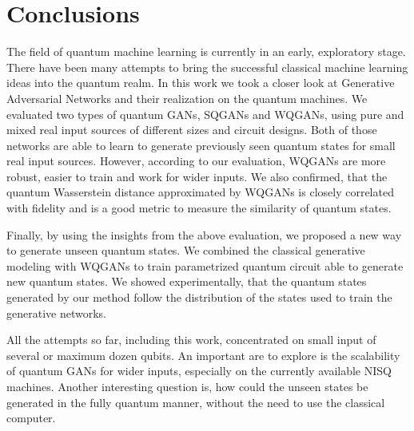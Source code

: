 \chapter{Conclusions}\label{chapter:conclusions}
The field of quantum machine learning is currently in an early, exploratory
stage. There have been many attempts to bring the successful classical machine
learning ideas into the quantum realm. In this work we took a closer look at
Generative Adversarial Networks and their realization on the quantum machines.
We evaluated two types of quantum GANs, SQGANs\cite{Dallaire_Demers_2018} and
WQGANs\cite{depalma2020quantum}, using pure and mixed real input sources of
different sizes and circuit designs. Both of those networks are able to learn to
generate previously seen quantum states for small real input sources.
However, according to our evaluation, WQGANs are more robust, easier to train
and work for wider inputs. We also confirmed, that the quantum
Wasserstein distance approximated by WQGANs is closely correlated with fidelity
and is a good metric to measure the similarity of quantum states.

Finally, by using the insights from the above evaluation, we proposed a new way
to generate unseen quantum states. We combined the classical generative modeling 
with WQGANs to train parametrized quantum circuit able to generate new quantum
states. We showed experimentally, that the quantum states generated by our
method follow the distribution of the states used to train the generative networks.

All the attempts so far, including this work, concentrated on small input of
several or maximum dozen qubits. An important are to explore is the
scalability of quantum GANs for wider inputs, especially on the currently available NISQ machines.  
Another interesting question is, how could the unseen states be generated
in the fully quantum manner, without the need to use the classical computer. 

